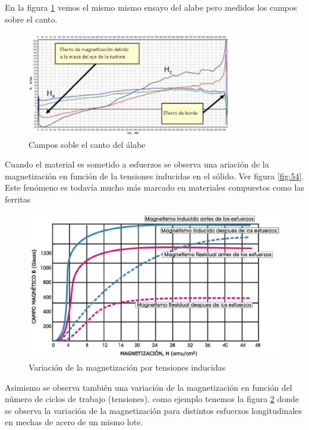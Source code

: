 En la figura \ref{fig:53} vemos el mismo mismo ensayo del alabe pero medidos los campos sobre el canto.

\begin{figure}[H]
    \centering
    \includegraphics[width=0.8\textwidth]{./Figures/fig53}
	\caption{Campos soble el canto del álabe}
	\label{fig:53}
\end{figure}

Cuando el material es sometido a esfuerzos se observa una ariación de la magnetización en función de la tensiones inducidas en el sólido. Ver figura \ref{fig:54}. Este fenómeno es todavía mucho más marcado en materiales compuestos como las ferritas 

\begin{figure}[H]
    \centering
    \includegraphics[width=1.0\textwidth]{./Figures/fig54}
	\caption{Variación de la magnetización por tensiones inducidas}
	\label{fig:55}
\end{figure}


Asimismo se observa también una variación de la magnetización en función del número de ciclos de trabajo (tensiones). como ejemplo tenemos la figura \ref{fig:55} donde se observa la variación de la magnetización para distintos esfuerzos longitudinales en mechas de acero de un mismo lote.

